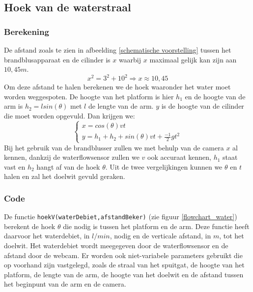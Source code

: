 \documentclass[kulak]{kulakarticle} %
\begin{document}
	\subsection{Hoek van de waterstraal}
		\subsubsection{Berekening}
			De afstand zoals te zien in afbeelding \ref{schematische voorstelling} tussen het brandblusapparaat en de cilinder is \(x\) waarbij \(x\) maximaal gelijk kan zijn aan \(10,45 m\).
				\begin{equation}
					x^2 = 3^2 + 10^2
					\Rightarrow x \approx 10,45 
				\end{equation}
			Om deze afstand te halen berekenen we de hoek waaronder het water moet worden weggespoten. De hoogte van het platform is hier \(h_1\) en de hoogte van de arm is \(h_2 = lsin(\theta)\) met \(l\) de lengte van de arm. \(y\) is de hoogte van de cilinder die moet worden opgevuld. Dan krijgen we:
				\begin{equation}
					\begin{cases}
						x  = cos(\theta) v t \\
						y = h_1 + h_2 + sin(\theta) v t + \frac{-1}{2} g t^2
					\end{cases}
				\end{equation}
			Bij het gebruik van de brandblusser zullen we met behulp van de camera \(x\) al kennen, dankzij de waterflowsensor zullen we \(v\) ook accuraat kennen, \(h_1\) staat vast en \(h_2\) hangt af van de hoek \(\theta\). Uit de twee vergelijkingen kunnen we \(\theta\) en \(t\) halen en zal het doelwit gevuld geraken.

		\subsubsection{Code}
			De functie \verb*|hoekV(waterDebiet,afstandBeker)| (zie figuur \ref{flowchart_water}) berekent de hoek \(\theta\)  die nodig is tussen het platform en de arm. Deze functie heeft daarvoor het waterdebiet, in \(l/min\), nodig en de verticale afstand, in \(m\), tot het doelwit. Het waterdebiet wordt meegegeven door de waterflowsensor en de afstand door de webcam. Er worden ook niet-variabele parameters gebruikt die op voorhand zijn vastgelegd, zoals de straal van het spuitgat, de hoogte van het platform, de lengte van de arm, de hoogte van het doelwit en de afstand tussen het beginpunt van de arm en de camera. 
\end{document}
